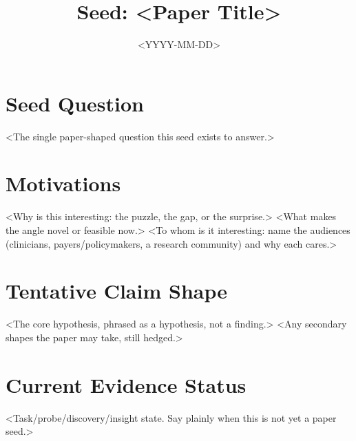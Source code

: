 \documentclass[11pt]{article}
\title{Seed: <Paper Title>}
\date{<YYYY-MM-DD>}
\begin{document}
\maketitle

\section*{Seed Question}

<The single paper-shaped question this seed exists to answer.>

\section*{Motivations}

<Why is this interesting: the puzzle, the gap, or the surprise.>
%
<What makes the angle novel or feasible now.>
%
<To whom is it interesting: name the audiences (clinicians, payers/policymakers, a research community) and why each cares.>

\section*{Tentative Claim Shape}

<The core hypothesis, phrased as a hypothesis, not a finding.>
%
<Any secondary shapes the paper may take, still hedged.>

\section*{Current Evidence Status}

<Task/probe/discovery/insight state. Say plainly when this is not yet a paper seed.>
\end{document}
